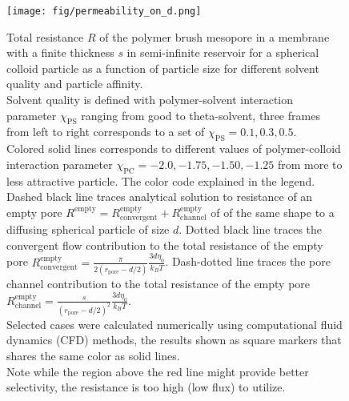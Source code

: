 \documentclass[12pt, a4paper]{article}
\begin{document}
\begin{figure}
    \centering
    \texttt{[image: fig/permeability\_on\_d.png]}
    \caption{
        Total resistance $R$ of the polymer brush mesopore in a membrane with a finite thickness $s$ in semi-infinite reservoir for a spherical colloid particle as a function of particle size for different solvent quality and particle affinity.
        \\
        Solvent quality is defined with polymer-solvent interaction parameter $\chi_{\textrm{PS}}$ ranging from good to theta-solvent, three frames from left to right corresponds to a set of $\chi_{\textrm{PS}} = {0.1, 0.3, 0.5}$.
        \\
        Colored solid lines corresponds to different values of polymer-colloid interaction parameter $\chi_{\textrm{PC}} = {-2.0, -1.75, -1.50, -1.25}$ from more to less attractive particle. 
        The color code explained in the legend.
        \\
        Dashed black line traces analytical solution to resistance of an empty pore $R^{\textrm{empty}} = R^{\textrm{empty}}_{\textrm{convergent}} + R^{\textrm{empty}}_{\textrm{channel}}$ of of the same shape to a diffusing spherical particle of size $d$.
        Dotted black line traces the convergent flow contribution to the total resistance of the empty pore $R^{\textrm{empty}}_{\textrm{convergent}} = \frac{\pi}{2 (r_{\textrm{pore}} - d/2)} \frac{3 d \eta_0}{k_B T}$.
        Dash-dotted line traces the pore channel contribution to the total resistance of the empty pore
        $R^{\textrm{empty}}_{\textrm{channel}} = \frac{s}{(r_{\textrm{pore}} - d/2)^2} \frac{3  d \eta_0}{k_B T}$.
        \\
        Selected cases were calculated numerically using computational fluid dynamics (CFD) methods, the results shown as square markers that shares the same color as solid lines.
        \\
        Note while the region above the red line might provide better selectivity, the resistance is too high (low flux) to utilize.
        }
        \label{fig:resistivity_on_d}
\end{figure}
\end{document}
